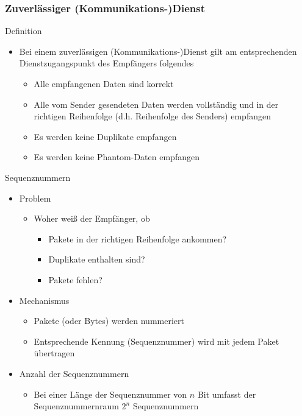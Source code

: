    \subsubsection{Zuverlässiger (Kommunikations-)Dienst}
      Definition
      \begin{itemize}
        \item Bei einem zuverlässigen (Kommunikations-)Dienst gilt am entsprechenden Dienstzugangspunkt
          des Empfängers folgendes
          \begin{itemize}
            \item Alle empfangenen Daten sind korrekt
            \item Alle vom Sender gesendeten Daten werden vollständig und in der richtigen
              Reihenfolge (d.h. Reihenfolge des Senders) empfangen
            \item Es werden keine Duplikate empfangen
            \item Es werden keine Phantom-Daten empfangen
          \end{itemize}
      \end{itemize}
      \pagebreak
      Sequenznummern
      \begin{itemize}
        \item Problem
          \begin{itemize}
            \item Woher weiß der Empfänger, ob
              \begin{itemize}
                \item Pakete in der richtigen Reihenfolge ankommen?
                \item Duplikate enthalten sind?
                \item Pakete fehlen?
              \end{itemize}
          \end{itemize}
        \item Mechanismus
          \begin{itemize}
            \item Pakete (oder Bytes) werden nummeriert
            \item Entsprechende Kennung (Sequenznummer) wird mit jedem Paket übertragen
          \end{itemize}
        \item Anzahl der Sequenznummern
          \begin{itemize}
            \item Bei einer Länge der Sequenznummer von $n$ Bit umfasst der Sequenznummernraum $2^n$
              Sequenznummern
          \end{itemize}
      \end{itemize}
